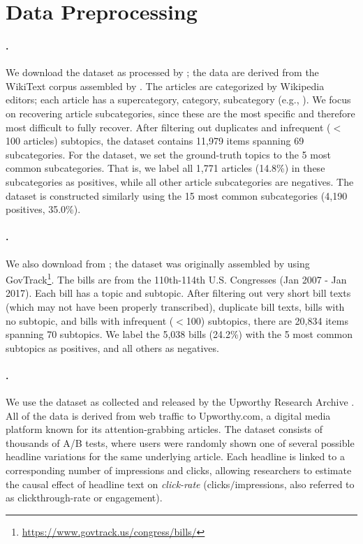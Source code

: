 



\section{Data Preprocessing}
\label{sec:preprocessing}

\paragraph{\wiki.} 
We download the dataset as processed by \citet{pham_topicgpt_2024}; the data are derived from the WikiText corpus assembled by \citet{merity_pointer_2016}. 
The articles are categorized by Wikipedia editors; each article has a supercategory, category, subcategory (e.g., ). 
We focus on recovering article subcategories, since these are the most specific and therefore most difficult to fully recover.
After filtering out duplicates and infrequent ($<$100 articles) subtopics, the dataset contains 11,979 items spanning 69 subcategories.
For the  dataset, we set the ground-truth topics to the 5 most common subcategories. 
That is, we label all 1,771 articles (14.8\%) in these subcategories as positives, while all other article subcategories are negatives.
The  dataset is constructed similarly using the 15 most common subcategories (4,190 positives, 35.0\%).

\paragraph{\bills.}
We also download \bills from \citet{pham_topicgpt_2024}; the dataset was originally assembled by \citet{hoyle_are_2022} using GovTrack\footnote{\href{https://www.govtrack.us/congress/bills/}{https://www.govtrack.us/congress/bills/}}.
The bills are from the 110th-114th U.S. Congresses (Jan 2007 - Jan 2017).
Each bill has a topic and subtopic.
After filtering out very short bill texts (which may not have been properly transcribed), duplicate bill texts, bills with no subtopic, and bills with infrequent ($<$100) subtopics, there are 20,834 items spanning 70 subtopics.
We label the 5,038 bills (24.2\%) with the 5 most common subtopics as positives, and all others as negatives.

\paragraph{\headlines.} We use the \headlines dataset as collected and released by the Upworthy Research Archive \citep{matias_upworthy_2021}.
All of the data is derived from web traffic to Upworthy.com, a digital media platform known for its attention-grabbing articles.
The dataset consists of thousands of A/B tests, where users were randomly shown one of several possible headline variations for the same underlying article.
Each headline is linked to a corresponding number of impressions and clicks, allowing researchers to estimate the causal effect of headline text on \textit{click-rate} (clicks$/$impressions, also referred to as clickthrough-rate or engagement).

